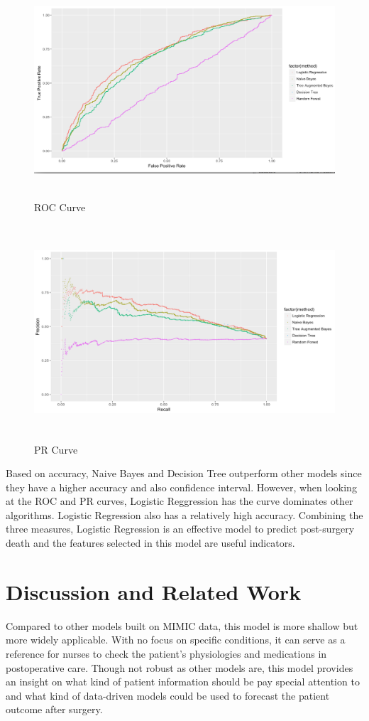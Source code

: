 \documentclass[twoside,11pt]{article}
\begin{document}
\begin{figure}[htbp]
  \centering 
  \includegraphics[height=8cm, width=15cm]{fig9} 
  \caption{ROC Curve}
  \label{fig9} 
\end{figure}

\begin{figure}[htbp]
  \centering 
  \includegraphics[height=8cm, width=15cm]{fig10} 
  \caption{PR Curve}
  \label{fig10} 
\end{figure}

Based on accuracy, Naive Bayes and Decision Tree outperform other models since they have a higher accuracy and also confidence interval. However, when looking at the ROC and PR curves, Logistic Reggression has the curve dominates other algorithms. Logistic Regression also has a relatively high accuracy. Combining the three measures, Logistic Regression is an effective model to predict post-surgery death and the features selected in this model are useful indicators.

\section{Discussion and Related Work} 
Compared to other models built on MIMIC data, this model is more shallow but more widely applicable. With no focus on specific conditions, it can serve as a reference for nurses to check the patient's physiologies and medications in postoperative care. Though not robust as other models are, this model provides an insight on what kind of patient information should be pay special attention to and what kind of data-driven models could be used to forecast the patient outcome after surgery.
\end{document}
